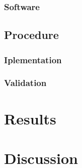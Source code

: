 \documentclass{report}
\numberwithin{equation}{section}
\begin{document}
\subsection{Software}
\section{Procedure}

\subsection{Iplementation}

\subsection{Validation}

\chapter{Results}

\chapter{Discussion}



\end{document}
